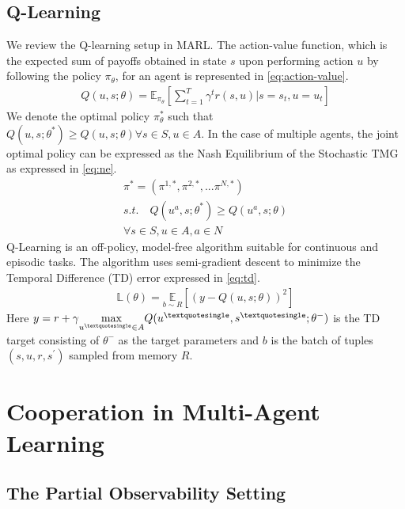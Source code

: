 \documentclass{article}
\begin{document}
\begin{multicols}{2}
\subsection{Q-Learning}
We review the Q-learning setup in MARL. The action-value function, which is the expected sum of payoffs obtained in state $s$ upon performing action $u$ by following the policy $\pi_{\theta}$, for an agent is represented in \autoref{eq:action-value}.
\begin{gather}
  Q(u,s;\theta) = \mathbb{E}_{\pi_{\theta}}[\sum_{t=1}^{T}\gamma^{t}r(s,u)|s=s_{t},u=u_{t}] \label{eq:action-value}
\end{gather}
We denote the optimal policy $\pi_{\theta}^{*}$ such that $Q(u,s;\theta^{*}) \geq Q(u,s;\theta) \forall s \in S, u \in A$. In the case of multiple agents, the joint optimal policy can be expressed as the Nash Equilibrium \cite{nash} of the Stochastic TMG as expressed in \autoref{eq:ne}. 
\begin{multline}
  \pi^{*} = (\pi^{1,*},\pi^{2,*}, ...\pi^{N,*})\\ s.t.\quad Q(u^{a},s;\theta^{*}) \geq Q(u^{a},s;\theta)\\ \forall s \in S, u \in A, a \in N \label{eq:ne}  
\end{multline}
Q-Learning is an off-policy, model-free algorithm suitable for continuous and episodic tasks. The algorithm uses semi-gradient descent to minimize the Temporal Difference (TD) error expressed in \autoref{eq:td}.
\begin{gather}
  \mathbb{L(\theta)} = \underset{b \sim R}{\mathbb{E}}[(y - Q(u,s;\theta))^{2}] \label{eq:td}
\end{gather}
Here $y = r + \gamma \underset{u^{\textquotesingle}\in A}{\max} Q(u^{\textquotesingle},s^{\textquotesingle};\theta^{-})$ is the TD target consisting of $\theta^{-}$ as the target parameters and $b$ is the batch of tuples $(s,u,r,s^{'})$ sampled from memory $R$.


\section{Cooperation in Multi-Agent Learning}

\subsection{The Partial Observability Setting}


\end{multicols}
\end{document}
